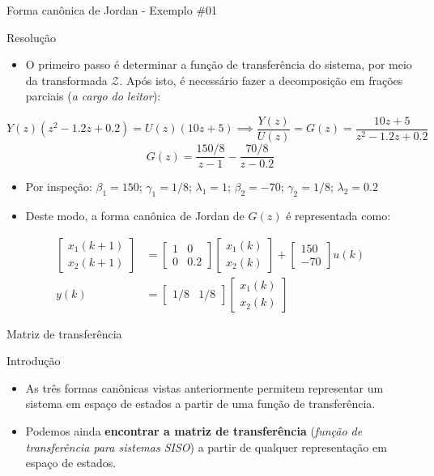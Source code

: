 \begin{frame}{Forma canônica de Jordan - Exemplo \#01}
\begin{block}{Resolução}
\begin{itemize}
    \item O primeiro passo é determinar a função de transferência do sistema, por meio da transformada $\mathcal{Z}$. Após isto, é necessário fazer a decomposição em frações parciais (\textit{a cargo do leitor}):
\end{itemize}
$$Y(z)(z^2 - \num{1,2}z + \num{0,2}) = U(z)(10z + 5) \implies \dfrac{Y(z)}{U(z)} = G(z) = \dfrac{10z + 5}{z^2 - \num{1,2}z + \num{0,2}}$$
$$G(z) = \dfrac{150/8}{z-1} - \dfrac{70/8}{z-\num{0,2}}$$
\vspace{-0.3cm}
\begin{itemize}
    \item Por inspeção: $\beta_1 = 150$; $\gamma_1 = 1/8$; $\lambda_1 = 1$; $\beta_2 = -70$; $\gamma_2 = 1/8$; $\lambda_2 = \num{0,2}$
    \item Deste modo, a forma canônica de Jordan de $G(z)$ é representada como:
\end{itemize}
\begin{align*}
    \begin{bmatrix} x_1(k+1) \\ x_2(k+1) \end{bmatrix}
    &=
    \begin{bmatrix}
    1 & 0 \\ 0 & \num{0,2}
    \end{bmatrix}
    \begin{bmatrix}
    x_1(k) \\ x_2(k)
    \end{bmatrix}
    +
    \begin{bmatrix}
    150 \\ -70
    \end{bmatrix}
    u(k) \\
    y(k)
    &=
    \begin{bmatrix}
    1/8 & 1/8
    \end{bmatrix}
    \begin{bmatrix}
    x_1(k) \\ x_2(k)
    \end{bmatrix}
\end{align*}
\end{block}
\end{frame}

\begin{frame}{Matriz de transferência}
\begin{block}{Introdução}
\begin{itemize}
    \item As três formas canônicas vistas anteriormente permitem representar um sistema em espaço de estados a partir de uma função de transferência.
    \item Podemos ainda \textbf{encontrar a matriz de transferência} (\textit{função de transferência para sistemas SISO}) a partir de qualquer representação em espaço de estados.
\end{itemize}
\end{block}
\end{frame}

